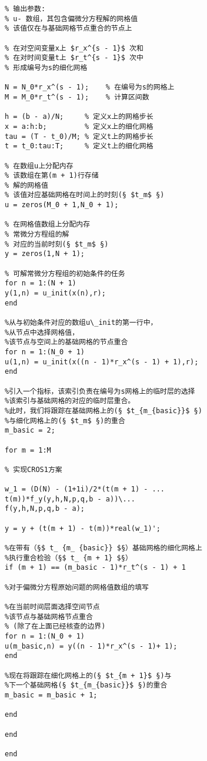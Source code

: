 \documentclass[twoside]{book}
\begin{document}
\begin{CJK*}{GBK}{song}
\begin{lstlisting}
% 输出参数:
% u- 数组，其包含偏微分方程解的网格值
% 该值仅在与基础网格节点重合的节点上

% 在对空间变量x上 $r_x^{s - 1}$ 次和
% 在对时间变量t上 $r_t^{s - 1}$ 次中
% 形成编号为s的细化网格

N = N_0*r_x^(s - 1);    % 在编号为s的网格上
M = M_0*r_t^(s - 1);    % 计算区间数

h = (b - a)/N;     % 定义x上的网格步长
x = a:h:b;         % 定义x上的细化网格
tau = (T - t_0)/M; % 定义t上的网格步长
t = t_0:tau:T;     % 定义t上的细化网格

% 在数组u上分配内存
% 该数组在第(m + 1)行存储
% 解的网格值
% 该值对应基础网格在时间上的时刻(§ $t_m$ §)
u = zeros(M_0 + 1,N_0 + 1);

% 在网格值数组上分配内存
% 常微分方程组的解
% 对应的当前时刻(§ $t_m$ §)
y = zeros(1,N + 1);

% 可解常微分方程组的初始条件的任务
for n = 1:(N + 1)
y(1,n) = u_init(x(n),r);
end

%从与初始条件对应的数组u\_init的第一行中，
%从节点中选择网格值，
%该节点与空间上的基础网格的节点重合
for n = 1:(N_0 + 1)
u(1,n) = u_init(x((n - 1)*r_x^(s - 1) + 1),r);
end

%引入一个指标，该索引负责在编号为s网格上的临时层的选择
%该索引与基础网格的对应的临时层重合。
%此时，我们将跟踪在基础网格上的(§ $t_{m_{basic}}$ §)
%与细化网格上的(§ $t_m$ §)的重合
m_basic = 2;

for m = 1:M

% 实现CROS1方案

w_1 = (D(N) - (1+1i)/2*(t(m + 1) - ...
t(m))*f_y(y,h,N,p,q,b - a))\...
f(y,h,N,p,q,b - a);

y = y + (t(m + 1) - t(m))*real(w_1)';

%在带有（§$ t_ {m_ {basic}} $§）基础网格的细化网格上
%执行重合检验（§$ t_ {m + 1} $§）
if (m + 1) == (m_basic - 1)*r_t^(s - 1) + 1

%对于偏微分方程原始问题的网格值数组的填写

%在当前时间层面选择空间节点
%该节点与基础网格节点重合
% (除了在上面已经核查的边界)
for n = 1:(N_0 + 1)
u(m_basic,n) = y((n - 1)*r_x^(s - 1)+ 1);
end

%现在将跟踪在细化网格上的(§ $t_{m + 1}$ §)与
%下一个基础网格(§ $t_{m_{basic}}$ §)的重合
m_basic = m_basic + 1;

end

end

end
\end{lstlisting}





\end{CJK*}
\end{document}
